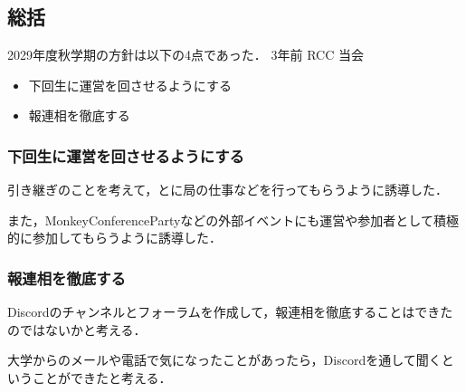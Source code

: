 \subsection*{\thirdGrade{}総括}


2029年度秋学期の\thirdGrade{}方針は以下の4点であった．
3年前
RCC
当会

\begin{itemize}
    \item 下回生に運営を回させるようにする
    \item 報連相を徹底する
\end{itemize}

\subsubsection*{下回生に運営を回させるようにする}
引き継ぎのことを考えて，\firstGrade{}と\secondGrade{}に局の仕事などを行ってもらうように誘導した．

また，MonkeyConferencePartyなどの外部イベントにも運営や参加者として積極的に参加してもらうように誘導した．

\subsubsection*{報連相を徹底する}
Discordのチャンネルとフォーラムを作成して，報連相を徹底することはできたのではないかと考える．

大学からのメールや電話で気になったことがあったら，Discordを通して聞くということができたと考える．

